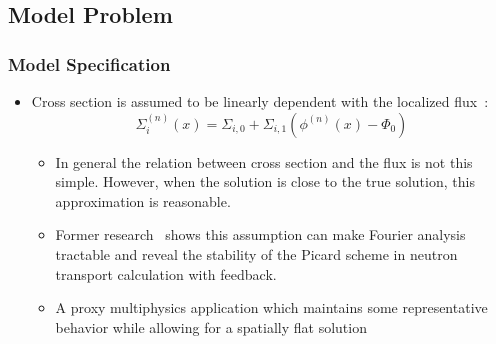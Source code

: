 \subsection{Model Problem}
\begin{frame}
\frametitle{Model Specification}
\begin{itemize}
\item Cross section is assumed to be linearly dependent with the localized flux~:
\begin{equation}
\Sigma_{i}^{\left(n\right)}\left(x\right) = \Sigma_{i,0} + \Sigma_{i,1} \left(\phi^{\left( n\right)}\left(x\right) - \Phi_0 \right)\label{eqn:updatexs}
\end{equation}
\vspace{-1em}
\begin{itemize}
    \item In general the relation between cross section and the flux is not this simple. However, when the solution is close to the true solution, this approximation is reasonable.
    \vspace{-0.5em}
    \item Former research~ shows this assumption can make Fourier analysis tractable and reveal the stability of the Picard scheme in neutron transport calculation with feedback. 
    \item A proxy multiphysics application which maintains some representative behavior while allowing for a spatially flat solution
\end{itemize}

\end{itemize}
\vfill
\end{frame}

